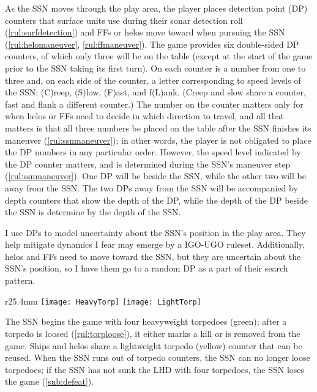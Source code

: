 \documentclass[../TacSubMicroRules.tex]{subfiles}
\begin{document}
 As the SSN moves through the play area, the player places detection point (DP) counters that surface units use during their sonar detection roll (\ref{rul:surfdetection}) and FFs or helos move toward when pursuing the SSN (\ref{rul:helomaneuver}, \ref{rul:ffmaneuver}).
The game provides six double-sided DP counters, of which only three will be on the table (except at the start of the game prior to the SSN taking its first turn).
On each counter is a number from one to three and, on each side of the counter, a letter corresponding to speed levels of the SSN: (C)reep, (S)low, (F)ast, and f(L)ank.
(Creep and slow share a counter, fast and flank a different counter.)
The number on the counter matters only for when helos or FFs need to decide in which direction to travel, and all that matters is that all three numbers be placed on the table after the SSN finishes its maneuver (\ref{rul:ssnmaneuver}); in other words, the player is not obligated to place the DP numbers in any particular order.
However, the speed level indicated by the DP counter matters, and is determined during the SSN's maneuver step (\ref{rul:ssnmaneuver}).
One DP will be beside the SSN, while the other two will be away from the SSN.
The two DPs away from the SSN will be accompanied by depth counters that show the depth of the DP, while the depth of the DP beside the SSN is determine by the depth of the SSN.

\begin{design}
    I use DPs to model uncertainty about the SSN's position in the play area.
    They help mitigate dynamics I fear may emerge by a IGO-UGO ruleset.
    Additionally, helos and FFs need to move toward the SSN, but they are uncertain about the SSN's position, so I have them go to a random DP as a part of their search pattern.
\end{design}

 
\begin{wrapfigure}{r}{25.4mm}
    \centering
    \texttt{[image: HeavyTorp]}
    \texttt{[image: LightTorp]}
\end{wrapfigure}
The SSN begins the game with four heavyweight torpedoes (green); after a torpedo is loosed (\ref{rul:torploose}), it either marks a kill or is removed from the game.
Ships and helos share a lightweight torpedo (yellow) counter that can be reused.
When the SSN runs out of torpedo counters, the SSN can no longer loose torpedoes; if the SSN has not sunk the LHD with four torpedoes, the SSN loses the game (\ref{sub:defeat}).
\end{document}
